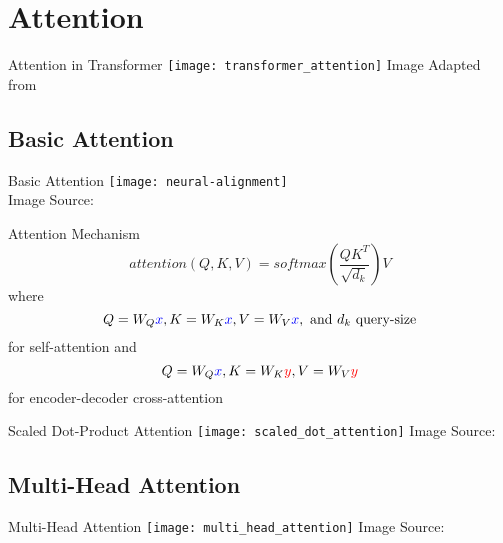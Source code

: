 \section{Attention}

\begin{frame}[c]{Attention in Transformer}
    \texttt{[image: transformer\_attention]}
    Image Adapted from \cite{vaswani_attention_2017}
\end{frame}


\subsection{Basic Attention}

\begin{frame}[c]{Basic Attention}
    \texttt{[image: neural-alignment]} \\
    Image Source: \cite{bahdanau_neural_2016}
\end{frame}

\begin{frame}[c]{Attention Mechanism}
    \large
    $$attention(Q, K, V) = softmax(\frac{QK^T}{\sqrt{d_k}})V$$
    \pause
    where
    $$Q = W_Q\textcolor{blue}{x}, K = W_K\textcolor{blue}{x}, V = W_V\textcolor{blue}{x}, \text{ and } d_k \text{ query-size}$$
    for self-attention \pause and
    $$Q = W_Q\textcolor{blue}{x}, K = W_K\textcolor{red}{y}, V = W_V\textcolor{red}{y}$$
    for encoder-decoder cross-attention
\end{frame}


\begin{frame}[c]{Scaled Dot-Product Attention}
    \texttt{[image: scaled\_dot\_attention]}
    Image Source: \cite{vaswani_attention_2017}
\end{frame}


\subsection{Multi-Head Attention}
\begin{frame}[c]{Multi-Head Attention}
    \texttt{[image: multi\_head\_attention]}
    Image Source: \cite{vaswani_attention_2017}
\end{frame}

